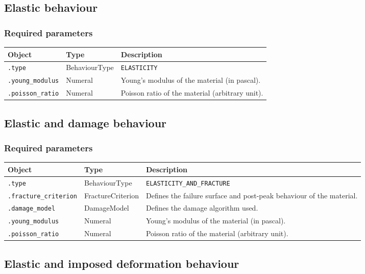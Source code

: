 \documentclass[10pt]{article}
\begin{document}
\subsection{Elastic behaviour}

\subsubsection*{Required parameters}

\begin{tabularx}{\textwidth}{llX}
\hline 
Object & Type & Description \\ 
\hline 
\verb+.type+ & BehaviourType & \verb+ELASTICITY+ \\ 
\verb+.young_modulus+ & Numeral & Young's modulus of the material (in pascal). \\ 
\verb+.poisson_ratio+ & Numeral & Poisson ratio of the material (arbitrary unit). \\ 
\hline 
\end{tabularx}

\subsection{Elastic and damage behaviour}

\subsubsection*{Required parameters}

\begin{tabularx}{\textwidth}{llX}
\hline 
Object & Type & Description \\ 
\hline 
\verb+.type+ & BehaviourType & \verb+ELASTICITY_AND_FRACTURE+ \\ 
\verb+.fracture_criterion+ & FractureCriterion & Defines the failure surface and post-peak behaviour of the material.\\
\verb+.damage_model+ & DamageModel & Defines the damage algorithm used.\\
\verb+.young_modulus+ & Numeral & Young's modulus of the material (in pascal). \\ 
\verb+.poisson_ratio+ & Numeral & Poisson ratio of the material (arbitrary unit). \\ 
\hline 
\end{tabularx}

\subsection{Elastic and imposed deformation behaviour}
\end{document}
